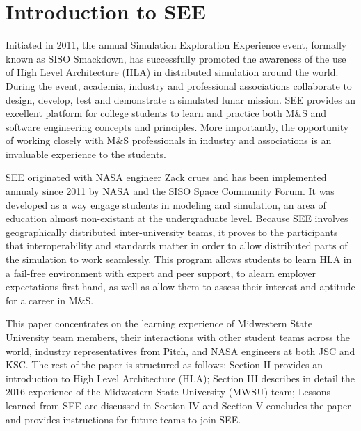 \documentclass[conference]{IEEEtran}
\begin{document}
%
\IEEEpeerreviewmaketitle

\section{Introduction to SEE}
Initiated in 2011, the annual Simulation Exploration Experience event, formally known as SISO Smackdown, has successfully promoted the awareness of the use of High Level Architecture (HLA) in distributed simulation around the world. During the event, academia, industry and professional associations collaborate to design, develop, test and demonstrate a simulated lunar mission. SEE provides an excellent platform for college students to learn and practice both M\&S and software engineering concepts and principles. More importantly, the opportunity of working closely with M\&S professionals in industry and associations is an invaluable experience to the students. 

SEE originated with NASA engineer Zack crues and has been implemented annualy since 2011 by NASA and the SISO Space Community Forum.  It was developed as a way engage students in modeling and simulation, an area of education almost non-existant at the undergraduate level.  Because SEE involves geographically distributed inter-university teams, it proves to the participants that interoperability and standards matter in order to allow distributed parts of the simulation to work seamlessly. This program allows students to learn HLA in a fail-free environment with expert and peer support, to alearn employer expectations first-hand, as well as allow them to assess their interest and aptitude for a career in M\&S.  

This paper concentrates on the learning experience of Midwestern State University team members, their interactions with other student teams across the world, industry representatives from Pitch, and NASA engineers at both JSC and KSC.  The rest of the paper is structured as follows: Section II provides an introduction to High Level Architecture (HLA); Section III describes in detail the 2016 experience of the Midwestern State University (MWSU) team; Lessons learned from SEE are discussed in Section IV and Section V concludes the paper and provides instructions for future teams to join SEE.
\end{document}
